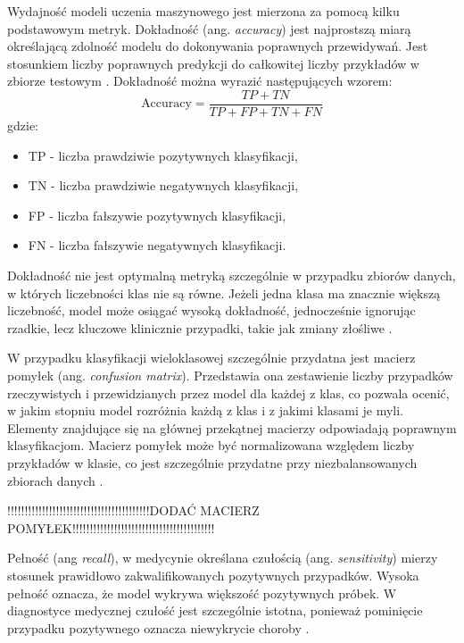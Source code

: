 Wydajność modeli uczenia maszynowego jest mierzona za pomocą kilku podstawowym metryk.
Dokładność (ang. \textit{accuracy}) jest najprostszą miarą określającą zdolność modelu do dokonywania poprawnych przewidywań. 
Jest stosunkiem liczby poprawnych predykcji do całkowitej liczby przykładów w zbiorze testowym \cite{Rainio_2024, Erickson_Kitamura_2021, Grandini_Bagli_Visani_2020, Nowak_2022}.
Dokładność można wyrazić następujących wzorem:
\begin{equation}
	\text{Accuracy} = \frac{TP+TN}{TP+FP+TN+FN}
\end{equation}
gdzie:

\begin{itemize}
	\item TP - liczba prawdziwie pozytywnych klasyfikacji,
	\item TN - liczba prawdziwie negatywnych klasyfikacji,
	\item FP - liczba fałszywie pozytywnych klasyfikacji,
	\item FN - liczba fałszywie negatywnych klasyfikacji.
\end{itemize}

Dokładność nie jest optymalną metryką szczególnie w przypadku zbiorów danych, w których liczebności klas nie są równe. 
Jeżeli jedna klasa ma znacznie większą liczebność, model może osiągać wysoką dokładność, jednocześnie ignorując rzadkie, lecz kluczowe klinicznie przypadki, takie jak zmiany złośliwe \cite{Grandini_Bagli_Visani_2020, Nowak_2022}.

W przypadku klasyfikacji wieloklasowej szczególnie przydatna jest macierz pomyłek (ang. \textit{confusion matrix}).
Przedstawia ona zestawienie liczby przypadków rzeczywistych i przewidzianych przez model dla każdej z klas, co pozwala ocenić, w jakim stopniu model rozróżnia każdą z klas i z jakimi klasami je myli.
Elementy znajdujące się na głównej przekątnej macierzy odpowiadają poprawnym klasyfikacjom.
Macierz pomyłek może być normalizowana względem liczby przykładów w klasie, co jest szczególnie przydatne przy niezbalansowanych zbiorach danych \cite{Rainio_2024}.

!!!!!!!!!!!!!!!!!!!!!!!!!!!!!!!!!!!!!!!!!DODAĆ MACIERZ POMYŁEK!!!!!!!!!!!!!!!!!!!!!!!!!!!!!!!!!!!!!!!!!

Pełność (ang \textit{recall}), w medycynie określana czułością (ang. \textit{sensitivity}) mierzy stosunek prawidłowo zakwalifikowanych pozytywnych przypadków.
Wysoka pełność oznacza, że model wykrywa większość pozytywnych próbek.
W diagnostyce medycznej czułość jest szczególnie istotna, ponieważ pominięcie przypadku pozytywnego oznacza niewykrycie choroby \cite{Rainio_2024, Nowak_2022}. 

